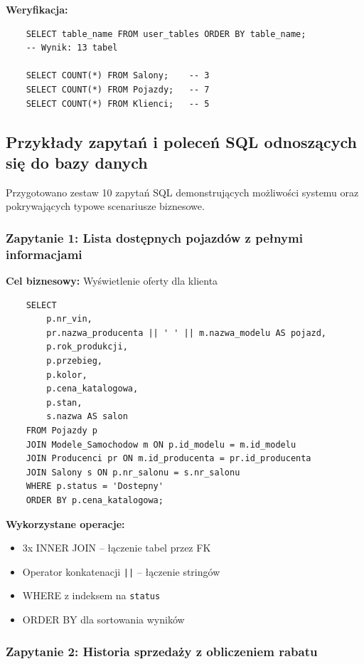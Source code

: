 \documentclass[a4paper,titleauthor]{mwart}
\begin{document}
	\textbf{Weryfikacja:}
	\begin{verbatim}
	SELECT table_name FROM user_tables ORDER BY table_name;
	-- Wynik: 13 tabel

	SELECT COUNT(*) FROM Salony;    -- 3
	SELECT COUNT(*) FROM Pojazdy;   -- 7
	SELECT COUNT(*) FROM Klienci;   -- 5
	\end{verbatim}

	\subsection{Przykłady zapytań i poleceń SQL odnoszących się do bazy danych}

	Przygotowano zestaw 10 zapytań SQL demonstrujących możliwości systemu oraz pokrywających typowe scenariusze biznesowe.

	\subsubsection{Zapytanie 1: Lista dostępnych pojazdów z pełnymi informacjami}

	\textbf{Cel biznesowy:} Wyświetlenie oferty dla klienta

	\begin{verbatim}
	SELECT 
		p.nr_vin,
		pr.nazwa_producenta || ' ' || m.nazwa_modelu AS pojazd,
		p.rok_produkcji,
		p.przebieg,
		p.kolor,
		p.cena_katalogowa,
		p.stan,
		s.nazwa AS salon
	FROM Pojazdy p
	JOIN Modele_Samochodow m ON p.id_modelu = m.id_modelu
	JOIN Producenci pr ON m.id_producenta = pr.id_producenta
	JOIN Salony s ON p.nr_salonu = s.nr_salonu
	WHERE p.status = 'Dostepny'
	ORDER BY p.cena_katalogowa;
	\end{verbatim}

	\textbf{Wykorzystane operacje:}
	\begin{itemize}
		\item 3x INNER JOIN -- łączenie tabel przez FK
		\item Operator konkatenacji \texttt{||} -- łączenie stringów
		\item WHERE z indeksem na \texttt{status}
		\item ORDER BY dla sortowania wyników
	\end{itemize}

	\subsubsection{Zapytanie 2: Historia sprzedaży z obliczeniem rabatu}
\end{document}
